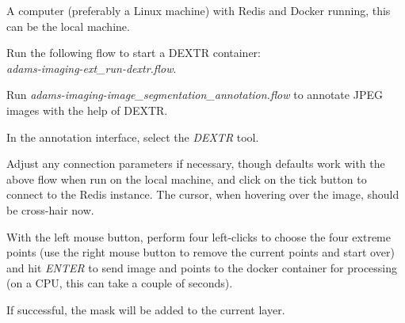 \documentclass[a4paper]{book}
\begin{document}
\begin{tight_itemize}
  \item A computer (preferably a Linux machine) with Redis\cite{redis} and Docker\cite{docker} running,
  this can be the local machine.
  \item Run the following flow to start a DEXTR container: \\
  \textit{adams-imaging-ext\_run-dextr.flow}.
  \item Run \textit{adams-imaging-image\_segmentation\_annotation.flow} to annotate JPEG images with the help of DEXTR.
  \begin{tight_itemize}
    \item In the annotation interface, select the \textit{DEXTR} tool.
    \item Adjust any connection parameters if necessary, though defaults work with the above flow when run on the
    local machine, and click on the tick button to connect to the Redis instance. The cursor, when hovering over
    the image, should be cross-hair now.
    \item With the left mouse button, perform four left-clicks to choose the four extreme points (use the right mouse
    button to remove the current points and start over) and hit \textit{ENTER} to send image and points to the docker
    container for processing (on a CPU, this can take a couple of seconds).
    \item If successful, the mask will be added to the current layer.
  \end{tight_itemize}
\end{tight_itemize}


\end{document}
